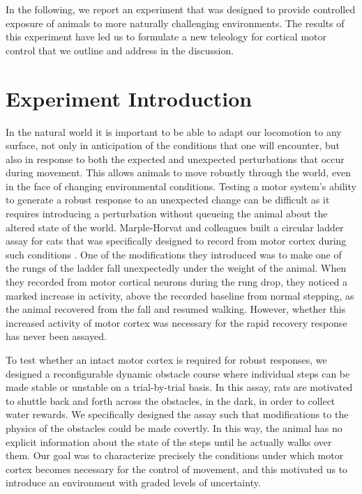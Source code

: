 In the following, we report an experiment that was designed to provide controlled exposure of animals to more naturally challenging environments. The results of this experiment have led us to formulate a new teleology for cortical motor control that we outline and address in the discussion.

\section{Experiment Introduction}

In the natural world it is important to be able to adapt our locomotion to any surface, not only in anticipation of the conditions that one will encounter, but also in response to both the expected and unexpected perturbations that occur during movement. This allows animals to move robustly through the world, even in the face of changing environmental conditions. Testing a motor system’s ability to generate a robust response to an unexpected change can be difficult as it requires introducing a perturbation without queueing the animal about the altered state of the world. Marple-Horvat and colleagues built a circular ladder assay for cats that was specifically designed to record from motor cortex during such conditions \cite{Marple-Horvat1993}. One of the modifications they introduced was to make one of the rungs of the ladder fall unexpectedly under the weight of the animal. When they recorded from motor cortical neurons during the rung drop, they noticed a marked increase in activity, above the recorded baseline from normal stepping, as the animal recovered from the fall and resumed walking. However, whether this increased activity of motor cortex was necessary for the rapid recovery response has never been assayed.

To test whether an intact motor cortex is required for robust responses, we designed a reconfigurable dynamic obstacle course where individual steps can be made stable or unstable on a trial-by-trial basis. In this assay, rats are motivated to shuttle back and forth across the obstacles, in the dark, in order to collect water rewards. We specifically designed the assay such that modifications to the physics of the obstacles could be made covertly. In this way, the animal has no explicit information about the state of the steps until he actually walks over them. Our goal was to characterize precisely the conditions under which motor cortex becomes necessary for the control of movement, and this motivated us to introduce an environment with graded levels of uncertainty.

